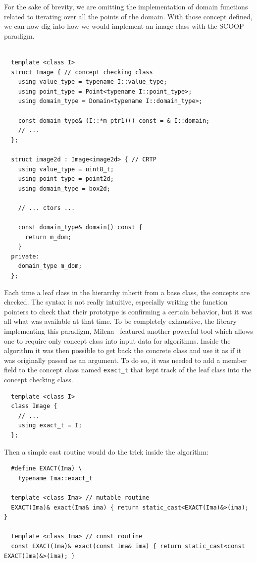 For the sake of brevity, we are omitting the implementation of domain functions related to iterating over all the points
of the domain. With those concept defined, we can now dig into how we would implement an image class with the SCOOP
paradigm.

\begin{verbatim}

  template <class I>
  struct Image { // concept checking class
    using value_type = typename I::value_type;
    using point_type = Point<typename I::point_type>;
    using domain_type = Domain<typename I::domain_type>;

    const domain_type& (I::*m_ptr1)() const = & I::domain;
    // ...
  };

  struct image2d : Image<image2d> { // CRTP
    using value_type = uint8_t;
    using point_type = point2d;
    using domain_type = box2d;

    // ... ctors ...

    const domain_type& domain() const {
      return m_dom;
    }
  private:
    domain_type m_dom;
  };
\end{verbatim}

Each time a leaf class in the hierarchy inherit from a base class, the concepts are checked. The syntax is not really
intuitive, especially writing the function pointers to check that their prototype is confirming a certain behavior, but
it was all what was available at that time. To be completely exhaustive, the library implementing this paradigm,
Milena~\parencite{levillain.2010.icip, levillain.2009.ismm} featured another powerful tool which allows one to require
only concept class into input data for algorithms. Inside the algorithm it was then possible to get back the concrete
class and use it as if it was originally passed as an argument. To do so, it was needed to add a member field to the
concept class named \texttt{exact\_t} that kept track of the leaf class into the concept checking class.

\begin{verbatim}
  template <class I>
  class Image {
    // ...
    using exact_t = I;
  };
\end{verbatim}

Then a simple cast routine would do the trick inside the algorithm:

\begin{verbatim}
  #define EXACT(Ima) \
    typename Ima::exact_t

  template <class Ima> // mutable routine
  EXACT(Ima)& exact(Ima& ima) { return static_cast<EXACT(Ima)&>(ima); }

  template <class Ima> // const routine
  const EXACT(Ima)& exact(const Ima& ima) { return static_cast<const EXACT(Ima)&>(ima); }
\end{verbatim}

